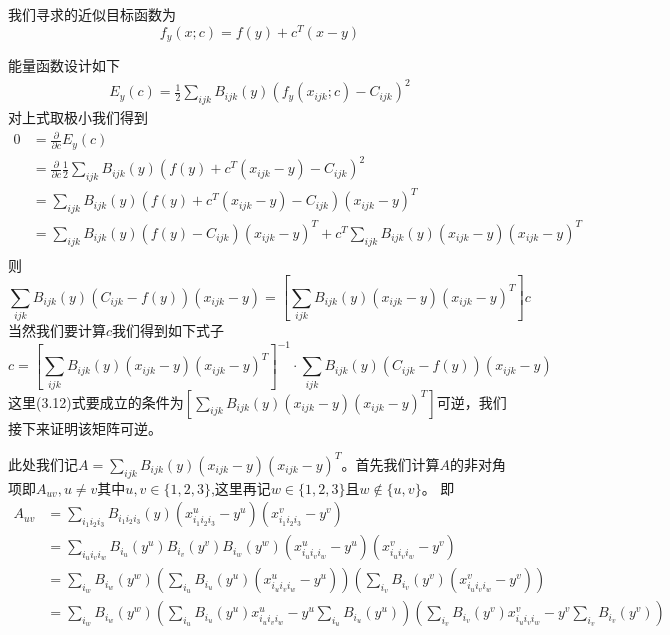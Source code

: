 我们寻求的近似目标函数为
\begin{equation}
    f_y (x;c) = f(y) + c^T(x - y)    
\end{equation}

能量函数设计如下
\begin{equation}
    \begin{split}
        E_y(c) = \frac{1}{2} \sum_{ijk} B_{ijk}(y)(f_y(x_{ijk};c) - C_{ijk})^2
    \end{split}
\end{equation}
对上式取极小我们得到
\begin{equation}
    \begin{split}
        0& = \frac{\partial}{\partial c} E_y(c)\\
        &= \frac{\partial}{\partial c} \frac{1}{2}\sum_{ijk} B_{ijk}(y)(f(y) + c^T (x_{ijk} - y) - C_{ijk})^2\\
        &= \sum_{ijk} B_{ijk}(y)(f(y) + c^T (x_{ijk} - y) - C_{ijk}) (x_{ijk} - y)^T\\
        &= \sum_{ijk} B_{ijk}(y)(f(y) - C_{ijk})(x_{ijk} - y)^T + c^T\sum_{ijk}B_{ijk}(y)(x_{ijk} - y)(x_{ijk} - y)^T\\ 
    \end{split}
\end{equation}
则 $$\sum_{ijk} B_{ijk}(y) (C_{ijk} - f(y)) (x_{ijk} - y) = [\sum_{ijk}B_{ijk}(y)(x_{ijk} - y)(x_{ijk} - y)^T]c $$
当然我们要计算$c$我们得到如下式子
\begin{equation}
    c = [\sum_{ijk}B_{ijk}(y)(x_{ijk} - y)(x_{ijk} - y)^T]^{-1} \cdot \sum_{ijk} B_{ijk}(y) (C_{ijk} - f(y)) (x_{ijk} - y)
\end{equation}
这里(3.12)式要成立的条件为$[\sum_{ijk}B_{ijk}(y)(x_{ijk} - y)(x_{ijk} - y)^T]$可逆，我们接下来证明该矩阵可逆。

此处我们记$A = \sum_{ijk}B_{ijk}(y)(x_{ijk} - y)(x_{ijk} - y)^T$。首先我们计算$A$的非对角项即$A_{uv}, u\neq v\text{其中} u,v \in \{1,2,3\}$,这里再记$w \in \{1,2,3\}\text{且} w \notin \{u,v\} $。
即
\begin{equation}
    \begin{split}
        A_{uv} &= \sum_{i_1 i_2 i_3} B_{i_1 i_2 i_3}(y) (x_{i_1 i_2 i_3}^u - y^u)(x_{i_1 i_2 i_3}^v - y^v)\\
        & = \sum_{i_u i_v i_w} B_{i_u}(y^u)B_{i_v}(y^v)B_{i_w}(y^w) (x_{i_u i_v i_w}^u - y^u)(x_{i_u i_v i_w}^v - y^v)\\
        & = \sum_{i_w}B_{i_w}(y^w)(\sum_{i_u}B_{i_u}(y^u)(x_{i_u i_v i_w}^u - y^u))(\sum_{i_v}B_{i_v}(y^v)(x_{i_u i_v i_w}^v - y^v))\\
        & =  \sum_{i_w}B_{i_w}(y^w)(\sum_{i_u}B_{i_u}(y^u)x_{i_u i_v i_w}^u - y^u\sum_{i_u}B_{i_u}(y^u))(\sum_{i_v}B_{i_v}(y^v)x_{i_u i_v i_w}^v - y^v\sum_{i_v}B_{i_v}(y^v))
    \end{split}
\end{equation}

